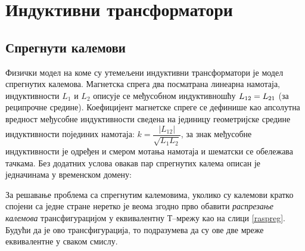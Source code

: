 \section{Индуктивни трансформатори}
\subsection{Спрегнути калемови}
Физички модел на коме су утемељени индуктивни трансформатори је модел 
спрегнутих калемова. Магнетска спрега два посматрана линеарна намотаја,
индуктивности $L_1$ и $L_2$ описује се
међусобном индуктивношћу $L_{\rm 12} = L_{\rm 21}$ (за реципрочне средине). Коефицијент магнетске спреге се дефинише као апсолутна 
вредност међусобне индуктивности сведена на јединицу геометријске
средине индуктивности појединих намотаја: 
$k = \dfrac{|L_{12}|}{\sqrt{L_1 L_2}}$, за знак међусобне 
индуктивности је одређен и смером мотања намотаја и шематски 
се обележава тачкама. Без додатних услова овакав пар спрегнутих 
калема описан је једначинама у временском домену:

\begin{center}
\end{center}

За решавање проблема са спрегнутим калемовима, уколико су калемови 
кратко спојени са једне стране неретко је веома згодно прво обавити \textit{распрезање калемова} трансфигурацијом у еквивалентну
Т--мрежу као на слици \ref{raspreg}. Будући да је ово трансфигурација, 
то подразумева да су ове две мреже еквивалентне у сваком смислу.

